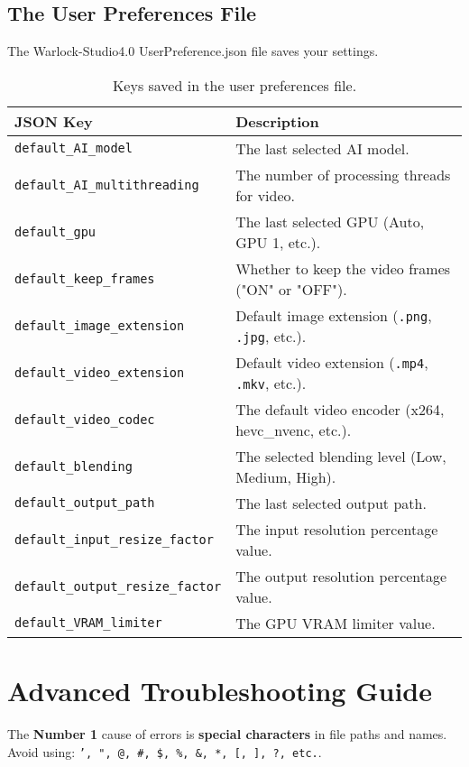 \documentclass[11pt, a4paper]{article}
\begin{document}
\subsection{The User Preferences File}
The Warlock-Studio4.0 UserPreference.json file saves your settings.
\begin{table}[H]
    \centering
    \small %
    \begin{tabularx}{\textwidth}{l X}
        \toprule
        \textbf{JSON Key} & \textbf{Description} \\
        \midrule
        \texttt{default\_AI\_model} & The last selected AI model. \\
        \texttt{default\_AI\_multithreading} & The number of processing threads for video. \\
        \texttt{default\_gpu} & The last selected GPU (Auto, GPU 1, etc.). \\
        \texttt{default\_keep\_frames} & Whether to keep the video frames ("ON" or "OFF"). \\
        \texttt{default\_image\_extension} & Default image extension (\texttt{.png}, \texttt{.jpg}, etc.). \\
        \texttt{default\_video\_extension} & Default video extension (\texttt{.mp4}, \texttt{.mkv}, etc.). \\
        \texttt{default\_video\_codec} & The default video encoder (x264, hevc\_nvenc, etc.). \\
        \texttt{default\_blending} & The selected blending level (Low, Medium, High). \\
        \texttt{default\_output\_path} & The last selected output path. \\
        \texttt{default\_input\_resize\_factor} & The input resolution percentage value. \\
        \texttt{default\_output\_resize\_factor} & The output resolution percentage value. \\
        \texttt{default\_VRAM\_limiter} & The GPU VRAM limiter value. \\
        \bottomrule
    \end{tabularx}
    \caption{Keys saved in the user preferences file.}
\end{table}

\section{Advanced Troubleshooting Guide}
\begin{warnbox}
The \textbf{Number 1} cause of errors is \textbf{special characters} in file paths and names. Avoid using: \texttt{', ", @, \#, \$, \%, \&, *, [, ], ?, etc.}.
\end{warnbox}
\end{document}

